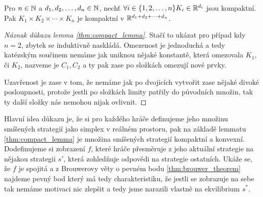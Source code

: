 \begin{theorem}
\label{thm:compact_lemma}
Pro $n \in \mathbb{N}$ a $d_1,d_2,\dots,d_n \in \mathbb{N}$, nechť $\forall i \in \{1,2,\dots,n\} K_i \in \mathbb{R}^{d_i}$ jsou kompaktní. 
Pak $K_1 \times K_2 \times \cdots \times K_n$ je kompaktní v $\mathbb{R}^{d_1 + d_2 + \dots + d_n}$. 
\end{theorem}
\begin{proof}[Náznak důkazu lemma \ref{thm:compact_lemma}]
Stačí to ukázat pro případ kdy $n =2$, zbytek se induktivně naskládá. 
Omezenost je jednoduchá a tedy katézským součinem nemáme jak uniknou nějaké konstantě, která omezovala $K_1$, či $K_2$, nazveme je $C_1, C_2$ a ty pak zase po složkách omezují nové prvky. 

Uzavřenost je zase v tom, že nemáme jak po dvojicích vytvořit zase nějaké divoké posloupnosti, protože jestli po složkách limity patřily do původních množin, tak ty další složky nás nemohou nijak ovlivnit. 
\end{proof}
Hlavní idea důkazu je, že si pro každého hráče definujeme jeho množinu smíšených strategií jako simplex v reálném prostoru, pak na základě lemmatu \ref{thm:compact_lemma} je množina smíšených strategií kompaktní a konvexní. 
Dodefinujeme si zobrazení $f$, které hráče přesměruje z jeho aktuální strategie na nějakou strategii $s'$, která zohledňuje odpovědi na strategie ostatních. 
Ukáže se, že $f$ je spojitá a z Brouwerovy věty o pevném bodu \ref{thm:brouwer_theorem} najdeme pevný bod který má tedy charakteristiku, že jestli se zobrazuje na sebe tak nemáme motivaci nic zlepšit a tedy jsme narazili vlastně na ekvilibrium $s^*$. 
